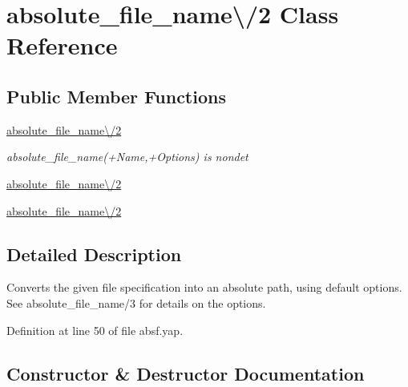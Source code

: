 \section{absolute\+\_\+file\+\_\+name\textbackslash{}/2 Class Reference}
\label{classabsolute__file__name_0C_22}
\subsection*{Public Member Functions}
\begin{DoxyCompactItemize}
\item 
\hyperlink{classabsolute__file__name_0C_22_af670f0ad37679e64866a9951558d4369}{absolute\+\_\+file\+\_\+name\textbackslash{}/2}
\begin{DoxyCompactList}\small\item\em absolute\+\_\+file\+\_\+name(+{\itshape Name},+{\itshape Options}) is nondet \end{DoxyCompactList}\item 
\hyperlink{classabsolute__file__name_0C_22_af670f0ad37679e64866a9951558d4369}{absolute\+\_\+file\+\_\+name\textbackslash{}/2}
\item 
\hyperlink{classabsolute__file__name_0C_22_af670f0ad37679e64866a9951558d4369}{absolute\+\_\+file\+\_\+name\textbackslash{}/2}
\end{DoxyCompactItemize}


\subsection{Detailed Description}
Converts the given file specification into an absolute path, using default options. See absolute\+\_\+file\+\_\+name/3 for details on the options. 

Definition at line 50 of file absf.\+yap.



\subsection{Constructor \& Destructor Documentation}
